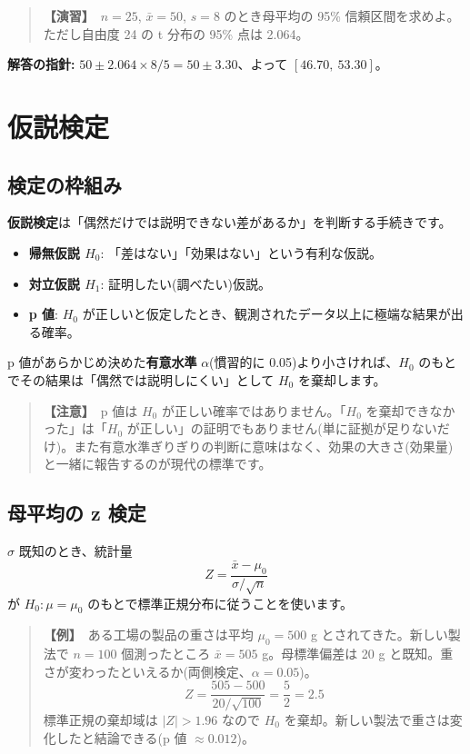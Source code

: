 \documentclass{article}
\begin{document}
\begin{quote}
\textbf{【演習】}\ \(n = 25\), \(\bar{x} = 50\), \(s = 8\) のとき母平均の 95\% 信頼区間を求めよ。ただし自由度 24 の t 分布の 95\% 点は 2.064。
\end{quote}

\textbf{解答の指針:} \(50 \pm 2.064 \times 8/5 = 50 \pm 3.30\)、よって \([46.70,\ 53.30]\)。

\section{仮説検定}

\subsection{検定の枠組み}

\textbf{仮説検定}は「偶然だけでは説明できない差があるか」を判断する手続きです。

\begin{itemize}
\item \textbf{帰無仮説 \(H_0\)}: 「差はない」「効果はない」という有利な仮説。
\item \textbf{対立仮説 \(H_1\)}: 証明したい(調べたい)仮説。
\item \textbf{p 値}: \(H_0\) が正しいと仮定したとき、観測されたデータ以上に極端な結果が出る確率。
\end{itemize}

p 値があらかじめ決めた\textbf{有意水準} \(\alpha\)(慣習的に 0.05)より小さければ、\(H_0\) のもとでその結果は「偶然では説明しにくい」として \(H_0\) を棄却します。

\begin{quote}
\textbf{【注意】}\ p 値は \(H_0\) が正しい確率ではありません。「\(H_0\) を棄却できなかった」は「\(H_0\) が正しい」の証明でもありません(単に証拠が足りないだけ)。また有意水準ぎりぎりの判断に意味はなく、効果の大きさ(効果量)と一緒に報告するのが現代の標準です。
\end{quote}

\subsection{母平均の z 検定}

\(\sigma\) 既知のとき、統計量
\[ Z = \frac{\bar{x} - \mu_0}{\sigma / \sqrt{n}} \]
が \(H_0: \mu = \mu_0\) のもとで標準正規分布に従うことを使います。

\begin{quote}
\textbf{【例】}\ ある工場の製品の重さは平均 \(\mu_0 = 500\) g とされてきた。新しい製法で \(n = 100\) 個測ったところ \(\bar{x} = 505\) g。母標準偏差は 20 g と既知。重さが変わったといえるか(両側検定、\(\alpha = 0.05\))。
\[ Z = \frac{505 - 500}{20/\sqrt{100}} = \frac{5}{2} = 2.5 \]
標準正規の棄却域は \(|Z| > 1.96\) なので \(H_0\) を棄却。新しい製法で重さは変化したと結論できる(p 値 \(\approx 0.012\))。
\end{quote}
\end{document}
